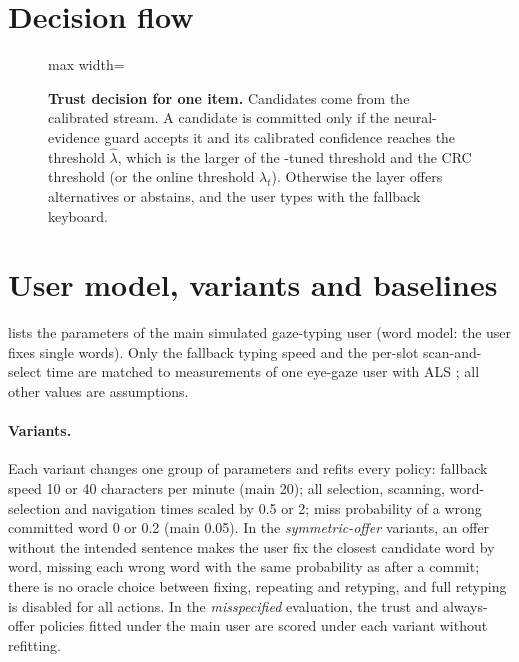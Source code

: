 \FloatBarrier
\section{Decision flow}
\label{app:decision}

\begin{figure}[H]
  \centering
  \begin{adjustbox}{max width=\linewidth}\end{adjustbox}
  \caption{\textbf{Trust decision for one item.} Candidates come from the calibrated stream. A candidate is committed only if the neural-evidence guard accepts it and its calibrated confidence reaches the threshold $\hat\lambda$, which is the larger of the \ewpm{}-tuned threshold and the CRC threshold (or the online threshold $\lambda_t$). Otherwise the layer offers alternatives or abstains, and the user types with the fallback keyboard.}
  \label{fig:decision}
\end{figure}

\FloatBarrier
\section{User model, variants and baselines}
\label{app:user}

 lists the parameters of the main simulated gaze-typing user (word model: the user fixes single words). Only the fallback typing speed and the per-slot scan-and-select time are matched to measurements of one eye-gaze user with ALS \citep{cai2024gaze}; all other values are assumptions.

\paragraph{Variants.} Each variant changes one group of parameters and refits every policy: fallback speed 10 or 40 characters per minute (main 20); all selection, scanning, word-selection and navigation times scaled by 0.5 or 2; miss probability of a wrong committed word 0 or 0.2 (main 0.05). In the \emph{symmetric-offer} variants, an offer without the intended sentence makes the user fix the closest candidate word by word, missing each wrong word with the same probability as after a commit; there is no oracle choice between fixing, repeating and retyping, and full retyping is disabled for all actions. In the \emph{misspecified} evaluation, the trust and always-offer policies fitted under the main user are scored under each variant without refitting.

